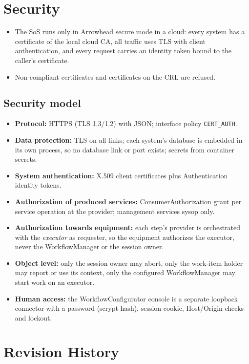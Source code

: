 \documentclass[a4paper]{arrowhead}
\begin{document}
\newpage
\section{Security}
\label{sec:security}
\begin{itemize}
\item The SoS runs only in Arrowhead secure mode in a cloud: every system has a certificate of the local cloud CA, all
traffic uses TLS with client authentication, and every request carries an identity token bound to the caller's
certificate.
\item Non-compliant certificates and certificates on the CRL are refused.
\end{itemize}
\subsection{Security model}
\begin{itemize}
\item \textbf{Protocol:} HTTPS (TLS 1.3/1.2) with JSON; interface policy \texttt{CERT\_AUTH}.
\item \textbf{Data protection:} TLS on all links; each system's database is embedded in its own process, so no database link or port exists; secrets from container secrets.
\item \textbf{System authentication:} X.509 client certificates plus Authentication identity tokens.
\item \textbf{Authorization of produced services:} ConsumerAuthorization grant per service operation at the provider;
management services sysop only.
\item \textbf{Authorization towards equipment:} each step's provider is orchestrated with the \emph{executor} as
requester, so the equipment authorizes the executor, never the WorkflowManager or the session owner.
\item \textbf{Object level:} only the session owner may abort, only the work-item holder may report or use its context,
only the configured WorkflowManager may start work on an executor.
\item \textbf{Human access:} the WorkflowConfigurator console is a separate loopback connector with a password (scrypt
hash), session cookie, Host/Origin checks and lockout.
\end{itemize}

\newpage



\newpage

\section{Revision History}
\end{document}
